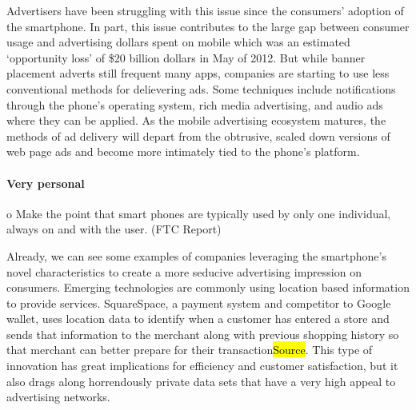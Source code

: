 Advertisers have been struggling with this issue since the consumers' adoption of the smartphone. In part, this issue contributes to the large gap between consumer usage and advertising dollars spent on mobile which was an estimated `opportunity loss' of \$20 billion dollars in May of 2012\cite{meeker}. 
But while banner placement adverts still frequent many apps, companies are starting to use less conventional methods for delievering ads. Some techniques include notifications through the phone's operating system, rich media advertising, and audio ads where they can be applied. As the mobile advertising ecosystem matures, the methods of ad delivery will depart from the obtrusive, scaled down versions of web page ads and become more intimately tied to the phone's platform. 



		\paragraph{Very personal}     %

o Make the point that smart phones are typically used by only one individual, always on and with the user. (FTC Report)

Already, we can see some examples of companies leveraging the smartphone's novel characteristics to create a more seducive advertising impression on consumers. 
Emerging technologies are commonly using location based information to provide services. SquareSpace, a payment system and competitor to Google wallet, uses location data to identify when a customer has entered a store and sends that information to the merchant along with previous shopping history so that merchant can better prepare for their transaction\hl{Source}. This type of innovation has great implications for efficiency and customer satisfaction, but it also drags along horrendously private data sets that have a very high appeal to advertising networks.

